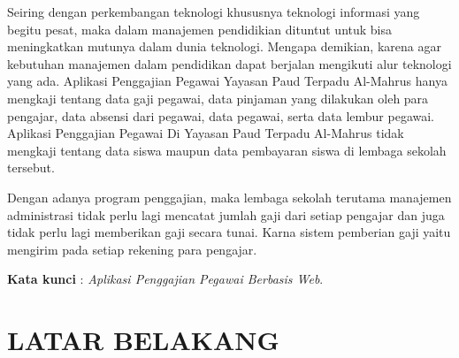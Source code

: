 \documentclass{jtetiproposalskripsi}
\begin{document}
\cover

\approvalpage


\begin{abstractind}
Seiring dengan perkembangan teknologi khususnya teknologi informasi yang begitu pesat, maka dalam manajemen pendidikian dituntut untuk bisa meningkatkan mutunya dalam dunia teknologi. Mengapa demikian, karena agar kebutuhan manajemen dalam pendidikan dapat berjalan mengikuti alur teknologi yang ada.
Aplikasi Penggajian Pegawai Yayasan Paud Terpadu Al-Mahrus hanya mengkaji tentang data gaji pegawai, data pinjaman yang dilakukan oleh para pengajar, data absensi dari pegawai, data pegawai, serta data lembur pegawai. Aplikasi Penggajian Pegawai Di Yayasan Paud Terpadu Al-Mahrus tidak mengkaji tentang data siswa maupun data pembayaran siswa di lembaga sekolah tersebut.

Dengan adanya program penggajian, maka lembaga sekolah terutama manajemen administrasi tidak perlu lagi mencatat jumlah gaji dari setiap pengajar dan juga tidak perlu lagi memberikan gaji secara tunai. Karna sistem pemberian gaji yaitu mengirim pada setiap rekening para pengajar.


\bigskip
\textbf{Kata kunci} : \emph{Aplikasi Penggajian Pegawai Berbasis Web}.
\end{abstractind}

\tableofcontents
{}
\clearpage{}\setcounter{page}{1}

\chapter{LATAR BELAKANG}
\end{document}
